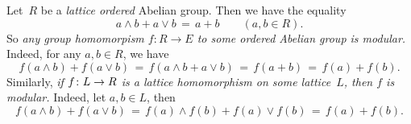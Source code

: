 \documentclass[main.tex]{subfiles}
\begin{document}
\begin{ex}
Let~$R$ be a \emph{lattice ordered} Abelian group.
Then we have the equality
\begin{equation*}
a\wedge b  + a\vee b \,=\, a+b \qquad(a,b\in R).
\end{equation*}
So \emph{any group homomorpism $f\colon R\rightarrow E$
to some ordered Abelian group
is modular.}
Indeed,
for any $a,b\in R$, we have
\begin{equation*}
f(a\wedge b) + f(a\vee b)
\,=\,f(a\wedge b + a\vee b) 
\,=\,f(a+ b)
\,=\, f(a) + f(b).
\end{equation*}
Similarly,
\emph{if $f\colon L\rightarrow R$ is a lattice homomorphism on 
some lattice~$L$,
then $f$ is modular.}
Indeed, let $a,b\in L$, then 
\begin{equation*}
f(a\wedge b) + f(a \vee b)
\,=\,f(a)\wedge f(b) + f(a) \vee f(b)
\,=\, f(a) + f(b).
\end{equation*}
\end{ex}
\end{document}
